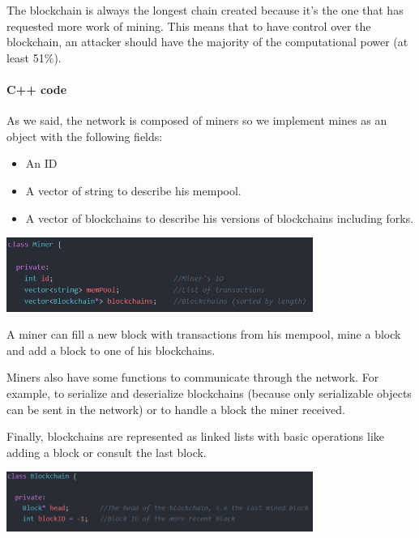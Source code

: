   The blockchain is always the longest chain created because it's the one that has requested more work of mining. This means that to have control over the blockchain, an attacker should have the majority of the computational power (at least 51\%). \newline

  \begin{aside}

  \paragraph{C++ code}

  As we said, the network is composed of miners so we implement mines as an object with the following fields: \newline

  \begin{itemize}
    \item An ID
    \item A vector of string to describe his mempool.
    \item A vector of blockchains to describe his versions of blockchains including forks.
  \end{itemize}
  \medskip

  \clearpage

  \medskip
  \includegraphics[width=10cm]{Figures/ClassMiner}
  \medskip

  A miner can fill a new block with transactions from his mempool, mine a block and add a block to one of his blockchains.

  Miners also have some functions to communicate through the network. For example, to serialize and deserialize blockchains (because only serializable objects can be sent in the network) or to handle a block the miner received. \newline

  Finally, blockchains are represented as linked lists with basic operations like adding a block or consult the last block. \newline

  \includegraphics[width=10cm]{Figures/ClassBlockchain}

  \end{aside}
  \medskip

